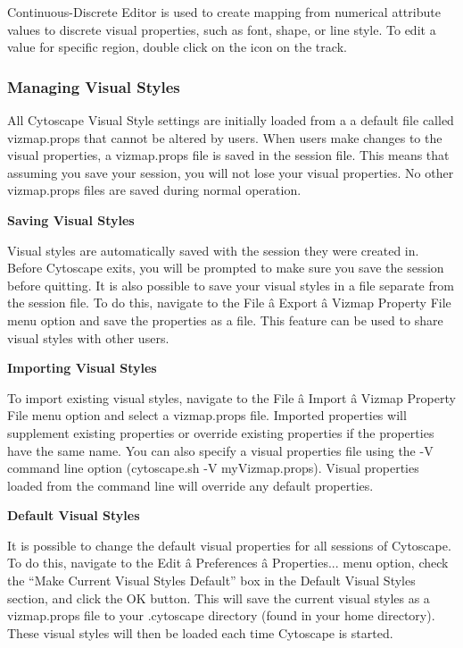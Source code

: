  Continuous-Discrete Editor is used to create mapping from numerical attribute values to discrete visual properties, such as font, shape, or line style. To edit a value for specific region, double click on the icon on the track. 


 

\subsubsection*{Managing Visual Styles}


 All Cytoscape Visual Style settings are initially loaded from a a default file called vizmap.props that cannot be altered by users. When users make changes to the visual properties, a vizmap.props file is saved in the session file. This means that assuming you save your session, you will not lose your visual properties. No other vizmap.props files are saved during normal operation. 


 \textbf{Saving Visual Styles}


 Visual styles are automatically saved with the session they were created in. Before Cytoscape exits, you will be prompted to make sure you save the session before quitting. It is also possible to save your visual styles in a file separate from the session file. To do this, navigate to the File \^a Export \^a Vizmap Property File menu option and save the properties as a file. This feature can be used to share visual styles with other users. 


 
\textbf{Importing Visual Styles}


 To import existing visual styles, navigate to the File \^a Import \^a Vizmap Property File menu option and select a vizmap.props file. Imported properties will supplement existing properties or override existing properties if the properties have the same name. You can also specify a visual properties file using the -V command line option (cytoscape.sh -V myVizmap.props). Visual properties loaded from the command line will override any default properties. 


 
\textbf{Default Visual Styles}


 It is possible to change the default visual properties for all sessions of Cytoscape. To do this, navigate to the Edit \^a Preferences \^a Properties... menu option, check the ``Make Current Visual Styles Default'' box in the Default Visual Styles section, and click the OK button. This will save the current visual styles as a vizmap.props file to your .cytoscape directory (found in your home directory). These visual styles will then be loaded each time Cytoscape is started. 


